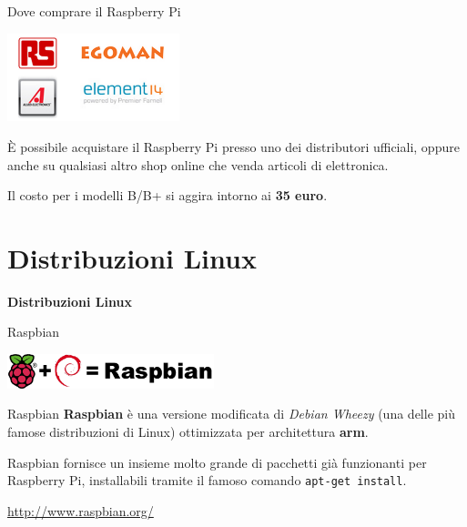 \documentclass[xcolor=svgnames,11pt]{beamer}
\begin{document}
\begin{frame}{Dove comprare il Raspberry Pi}

\begin{center}
\includegraphics[width=5cm]{wherebuy.png}
\end{center}

\`E possibile acquistare il Raspberry Pi presso uno dei distributori ufficiali, oppure anche su qualsiasi altro shop online che venda articoli di elettronica.

\medskip

Il costo per i modelli B/B+ si aggira intorno ai \textbf{35 euro}.

\end{frame}

\section{Distribuzioni Linux}

\begin{frame}{}
\begin{center}
\begin{Huge}
{\color{green_raspi} \textbf{Distribuzioni Linux}}
\end{Huge}
\end{center}
\end{frame}

\begin{frame}{Raspbian}
\begin{center}
\includegraphics[width=6cm]{raspbian_logo.png}
\end{center}

\pause
\medskip

\begin{block}{Raspbian}
\textbf{Raspbian} \`e una versione modificata di \emph{Debian Wheezy} (una delle pi\`u famose distribuzioni di Linux) ottimizzata per architettura \textbf{arm}.
\end{block}

\pause
\medskip

Raspbian fornisce un insieme molto grande di pacchetti gi\`a funzionanti per Raspberry Pi, installabili tramite il famoso comando \texttt{apt-get install}.

\pause
\medskip
\begin{center}
\url{http://www.raspbian.org/}
\end{center}
\end{frame}
\end{document}
